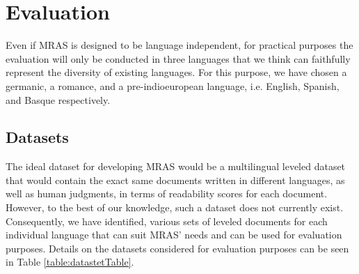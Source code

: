 \documentclass[12pt]{article}
\begin{document}

\section{Evaluation}

Even if MRAS is designed to be language independent, for practical purposes the evaluation will only be conducted in three languages that we think can faithfully represent the diversity of existing languages. For this purpose, we have chosen a germanic, a romance, and a pre-indioeuropean language, i.e. English, Spanish, and Basque respectively.


\subsection{Datasets}
The ideal dataset for developing MRAS would be a multilingual leveled dataset that would contain the exact same documents written in different languages, as well as human judgments, in terms of readability scores for each document. However, to the best of our knowledge, such a dataset does not currently exist. Consequently, we have identified, various sets of leveled documents for each individual language that can suit MRAS' needs and can be used for evaluation purposes. Details on the datasets considered for evaluation purposes can be seen in Table \ref{table:datastetTable}.
\end{document}
